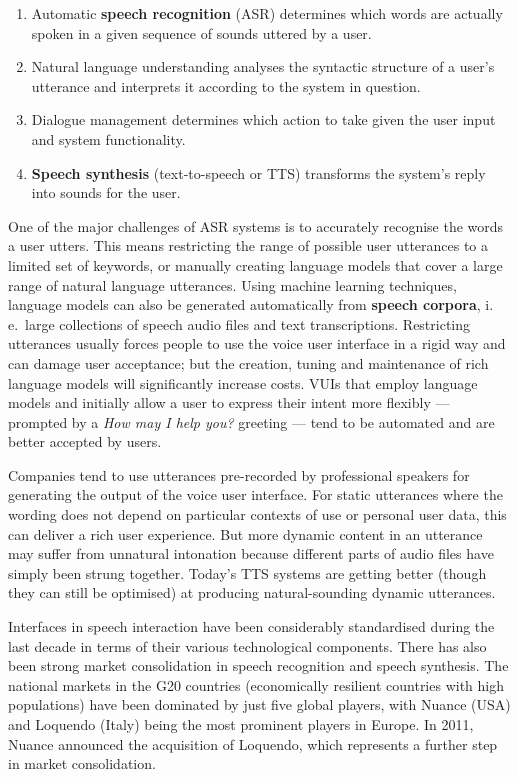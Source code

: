 \begin{multicols}{2}
\begin{enumerate}
\item Automatic \textbf{speech recognition} (ASR) determines which words are actually spoken in a given sequence of sounds uttered by a user.
\item Natural language understanding analyses the syntactic structure of a user’s utterance and interprets it according to the system in question.
\item  Dialogue management determines which action to take given the user input and system functionality.
\item \textbf{Speech synthesis} (text-to-speech or TTS) transforms the system’s reply into sounds for the user. 
\end{enumerate}
One of the major challenges of ASR systems is to accurately recognise the words a user utters. This means restricting the range of possible user utterances to a limited set of keywords, or manually creating language models that cover a large range of natural language utterances. Using machine learning techniques, language models can also be generated automatically from \textbf{speech corpora}, i.\,e.~large collections of speech audio files and text transcriptions. Restricting utterances usually forces people to use the voice user interface in a rigid way and can damage user acceptance; but the creation, tuning and maintenance of rich language models will significantly increase costs. VUIs that employ language models and initially allow a user to express their intent more flexibly — prompted by a \textit{How may I help you?} greeting — tend to be automated and are better accepted by users. 


Companies tend to use utterances pre-recorded by professional speakers for generating the output of the voice user interface. For static utterances where the wording does not depend on particular contexts of use or personal user data, this can deliver a rich user experience. But more dynamic content in an utterance may suffer from unnatural intonation because different parts of audio files have simply been strung together. Today’s TTS systems are getting better (though they can still be optimised) at producing natural-sounding dynamic utterances.  


Interfaces in speech interaction have been considerably standardised during the last decade in terms of their various technological components. There has also been strong market consolidation in speech recognition and speech synthesis. The national markets in the G20 countries (economically resilient countries with high populations) have been dominated by just five global players, with Nuance (USA) and Loquendo (Italy) being the most prominent players in Europe. In 2011, Nuance announced the acquisition of Loquendo, which represents a further step in market consolidation.


\end{multicols}
